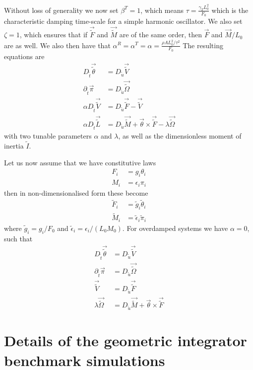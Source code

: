 \documentclass[withindex,glossary,techreport]{cam-thesis}
\begin{document}
\begin{appendices}
Without loss of generality we now set $\beta^{T}=1$, which means
$\tau=\frac{\gamma_{T}L_{0}^{2}}{F_{0}}$ which is the characteristic
damping time-scale for a simple harmonic oscillator. We also set $\zeta=1$,
which ensures that if $\vec{\tilde{F}}$ and $\vec{\tilde{M}}$ are
of the same order, then $\vec{F}$ and $\vec{M}/L_{0}$ are as well.
We also then have that $\alpha^{R}=\alpha^{T}=\alpha=\frac{\rho AL_{0}^{2}/\tau^{2}}{F_{0}}$
The resulting equations are
\begin{align}
D_{\tilde{t}}\vec{\tilde{\theta}} & =D_{\tilde{u}}\vec{\tilde{V}}\\
\partial_{\tilde{t}}\vec{\pi} & =D_{\tilde{u}}\vec{\tilde{\Omega}}\\
\alpha D_{\tilde{t}}\vec{\tilde{V}} & =D_{\tilde{u}}\vec{\tilde{F}}-\vec{\tilde{V}}\\
\alpha D_{\tilde{t}}\vec{\tilde{L}} & =D_{\tilde{u}}\vec{\tilde{M}}+\vec{\theta}\times\vec{\tilde{F}}-\lambda\vec{\tilde{\Omega}}
\end{align}
with two tunable parameters $\alpha$ and $\lambda$, as well as the
dimensionless moment of inertia $\tilde{I}$.

Let us now assume that we have constitutive laws
\begin{align*}
F_{i} & =g_{i}\theta_{i}\\
M_{i} & =\epsilon_{i}\pi_{i}
\end{align*}
then in non-dimensionalised form these become
\begin{align*}
\tilde{F}_{i} & =\tilde{g}_{i}\tilde{\theta}_{i}\\
\tilde{M}_{i} & =\tilde{\epsilon}_{i}\tilde{\pi}_{i}
\end{align*}
where $\tilde{g}_{i}=g_{i}/F_{0}$ and $\tilde{\epsilon}_{i}=\epsilon_{i}/(L_{0}M_{0})$. For overdamped systems we have $\alpha=0$, such that
\begin{align}
D_{\tilde{t}}\vec{\tilde{\theta}} & =D_{\tilde{u}}\vec{\tilde{V}}\\
\partial_{\tilde{t}}\vec{\pi} & =D_{\tilde{u}}\vec{\tilde{\Omega}}\\
\vec{\tilde{V}} & =D_{\tilde{u}}\vec{\tilde{F}}\nonumber \\
\lambda\vec{\tilde{\Omega}} & =D_{\tilde{u}}\vec{\tilde{M}}+\vec{\theta}\times\vec{\tilde{F}}
\end{align}



\chapter{Details of the geometric integrator benchmark simulations}


\end{appendices}
\end{document}
